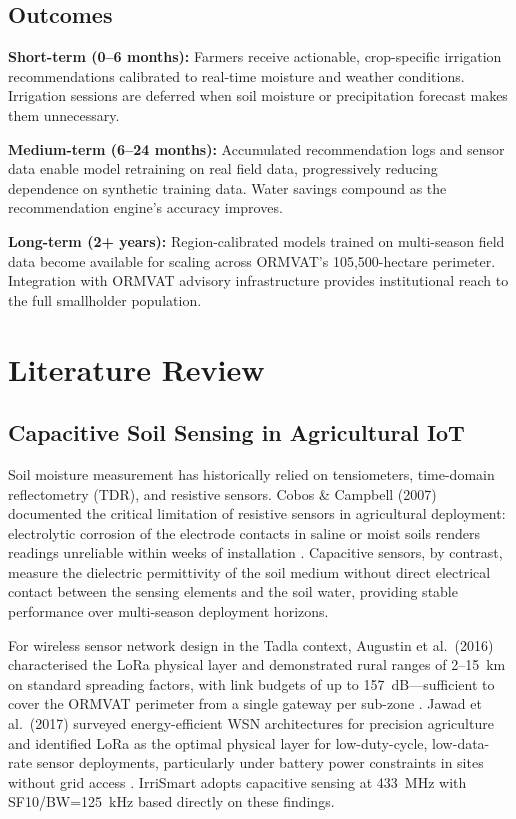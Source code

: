 \documentclass[12pt,a4paper]{report}
\begin{document}
\section{Outcomes}

\textbf{Short-term (0--6 months):} Farmers receive actionable, crop-specific irrigation recommendations calibrated to real-time moisture and weather conditions. Irrigation sessions are deferred when soil moisture or precipitation forecast makes them unnecessary.

\textbf{Medium-term (6--24 months):} Accumulated recommendation logs and sensor data enable model retraining on real field data, progressively reducing dependence on synthetic training data. Water savings compound as the recommendation engine's accuracy improves.

\textbf{Long-term (2+ years):} Region-calibrated models trained on multi-season field data become available for scaling across ORMVAT's 105,500-hectare perimeter. Integration with ORMVAT advisory infrastructure provides institutional reach to the full smallholder population.

\chapter{Literature Review}

\section{Capacitive Soil Sensing in Agricultural IoT}

Soil moisture measurement has historically relied on tensiometers, time-domain reflectometry (TDR), and resistive sensors. Cobos \& Campbell (2007) documented the critical limitation of resistive sensors in agricultural deployment: electrolytic corrosion of the electrode contacts in saline or moist soils renders readings unreliable within weeks of installation \cite{cobos2007}. Capacitive sensors, by contrast, measure the dielectric permittivity of the soil medium without direct electrical contact between the sensing elements and the soil water, providing stable performance over multi-season deployment horizons.

For wireless sensor network design in the Tadla context, Augustin et al.\ (2016) characterised the LoRa physical layer and demonstrated rural ranges of 2--15~km on standard spreading factors, with link budgets of up to 157~dB---sufficient to cover the ORMVAT perimeter from a single gateway per sub-zone \cite{augustin2016}. Jawad et al.\ (2017) surveyed energy-efficient WSN architectures for precision agriculture and identified LoRa as the optimal physical layer for low-duty-cycle, low-data-rate sensor deployments, particularly under battery power constraints in sites without grid access \cite{jawad2017}. IrriSmart adopts capacitive sensing at 433~MHz with SF10/BW=125~kHz based directly on these findings.
\end{document}

